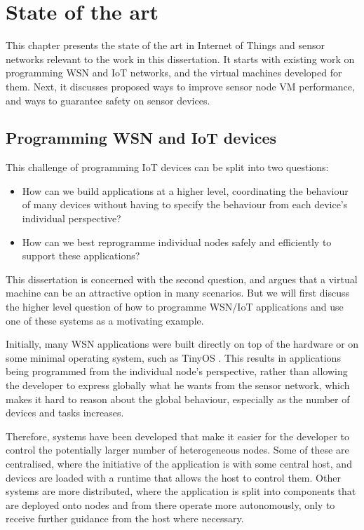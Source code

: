 \chapter{State of the art}
This chapter presents the state of the art in Internet of Things and sensor networks relevant to the work in this dissertation. It starts with existing work on programming WSN and IoT networks, and the virtual machines developed for them. Next, it discusses proposed ways to improve sensor node VM performance, and ways to guarantee safety on sensor devices.

\section{Programming WSN and IoT devices}

This challenge of programming IoT devices can be split into two questions:

\begin{itemize}
    \item How can we build applications at a higher level, coordinating the behaviour of many devices without having to specify the behaviour from each device's individual perspective?
    \item How can we best reprogramme individual nodes safely and efficiently to support these applications?
\end{itemize}

This dissertation is concerned with the second question, and argues that a virtual machine can be an attractive option in many scenarios. But we will first discuss the higher level question of how to programme WSN/IoT applications and use one of these systems as a motivating example.

Initially, many WSN applications were built directly on top of the hardware or on some minimal operating system, such as TinyOS \cite{Levis:2004ws}. This results in applications being programmed from the individual node's perspective, rather than allowing the developer to express globally what he wants from the sensor network, which makes it hard to reason about the global behaviour, especially as the number of devices and tasks increases.

Therefore, systems have been developed that make it easier for the developer to control the potentially larger number of heterogeneous nodes. Some of these are centralised, where the initiative of the application is with some central host, and devices are loaded with a runtime that allows the host to control them. Other systems are more distributed, where the application is split into components that are deployed onto nodes and from there operate more autonomously, only to receive further guidance from the host where necessary.

